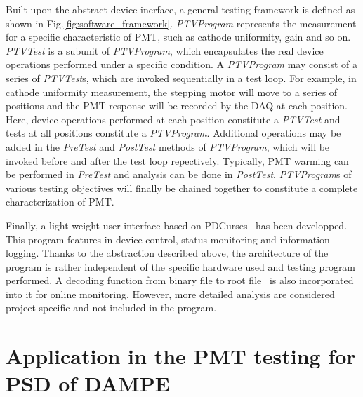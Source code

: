 \documentclass[5p, times]{elsarticle}
\begin{document}
Built upon the abstract device inerface, a general testing framework is defined as shown in Fig.\ref{fig:software_framework}.
\textit{PTVProgram} represents the measurement for a specific characteristic of PMT, such as cathode uniformity, gain and so on.
\textit{PTVTest} is a subunit of \textit{PTVProgram}, which encapsulates the real device operations performed under a specific condition.
A \textit{PTVProgram} may consist of a series of \textit{PTVTest}s, which are invoked sequentially in a test loop.
For example, in cathode uniformity measurement, the stepping motor will move to a series of positions and the PMT response will be recorded by the DAQ at each position.
Here, device operations performed at each position constitute a \textit{PTVTest} and tests at all positions constitute a \textit{PTVProgram}.
Additional operations may be added in the \textit{PreTest} and \textit{PostTest} methods of \textit{PTVProgram}, which will be invoked before and after the test loop repectively.
Typically, PMT warming can be performed in \textit{PreTest} and analysis can be done in \textit{PostTest}.
\textit{PTVProgram}s of various testing objectives will finally be chained together to constitute a complete characterization of PMT.

Finally, a light-weight user interface based on PDCurses~\cite{pdcurses} has been developped.
This program features in device control, status monitoring and information logging.
Thanks to the abstraction described above, the architecture of the program is rather independent of the specific hardware used and testing program performed.
A decoding function from binary file to root file~\cite{root} is also incorporated into it for online monitoring.
However, more detailed analysis are considered project specific and not included in the program. 

\section{Application in the PMT testing for PSD of DAMPE}
\label{sec:application}
\end{document}
